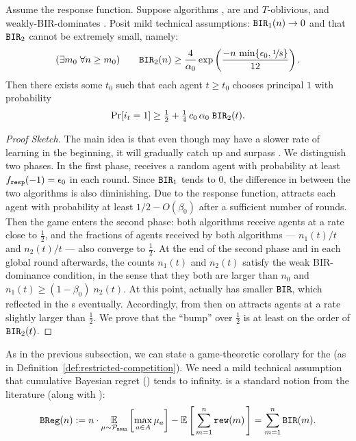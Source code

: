 \begin{theorem}\label{thm:SoftMax-strong}
Assume the \SoftMaxRandom response function. Suppose algorithms \alg[1], \alg[2] are \bmonotone and $T$-oblivious, and \alg[1] weakly-BIR-dominates \alg[2]. Posit mild technical assumptions:
  $\mathtt{BIR}_1(n) \to 0$ and that $\mathtt{BIR}_2$ cannot be extremely small, namely:
\begin{align}\label{eq:SoftMax-assn-strong}
(\exists m_0\; \forall n\geq m_0) \qquad
\mathtt{BIR}_2(n) \geq \frac{4}{\alpha_0}
\exp \left( \frac{-n\,\min\{\epsilon_0, \nicefrac{1}{8}\}}{12}\right).
\end{align}
Then there
  exists some $t_0$ such that each agent $t\geq t_0$ chooses principal
  $1$ with probability
\begin{align}\label{eq:thm:SoftMax-strong}
     \Pr[i_t = 1]\geq \tfrac12 +  \tfrac14 \,c_0\,\alpha_0\; \mathtt{BIR}_2(t).
\end{align}
\end{theorem}

\begin{proof}[Proof Sketch]
The main idea is that even though \alg[1] may have a
slower rate of learning in the beginning, it will gradually catch up
and surpass \alg[2]. We distinguish two phases. In
the first phase, \alg[1] receives a random agent with probability at
least $f_{\mathtt{resp}}(-1) = \epsilon_0$ in each round. Since $\mathtt{BIR}_1$ tends to 0,
the difference in  between the two algorithms is also
diminishing. Due to the \SoftMaxRandom response function, \alg[1]
attracts each agent with probability at least $1/2 - O(\beta_0)$ after
a sufficient number of rounds. Then the game enters the second phase:
both algorithms receive agents at a rate close to $\tfrac12$, and the
fractions of agents received by both algorithms --- $n_1(t)/t$ and
$n_2(t)/t$ --- also converge to $\tfrac12$. At the end of the second
phase and in each global round afterwards, the counts $n_1(t)$ and
$n_2(t)$ satisfy the weak BIR-dominance condition, in the sense that
they both are larger than $n_0$ and $n_1(t)\geq (1-\beta_0)\; n_2(t)$.
At this point, \alg[1] actually has smaller $\mathtt{BIR}$, which reflected in the {\PMR}s eventually. Accordingly, from then on \alg[1]
attracts agents at a rate slightly larger than $\tfrac12$. We prove
that the ``bump'' over $\tfrac12$ is at least on the order of
$\mathtt{BIR}_2(t)$.
\end{proof}

As in the previous subsection, we can state a game-theoretic corollary for the \FiniteGame (as in Definition~\ref{def:restricted-competition}). We need a mild technical assumption that cumulative Bayesian regret (\BReg) tends to infinity. \BReg is a standard notion from the literature (along with \BIR):
\begin{align}\label{eq:SoftMax-BReg}
\BReg(n) := n\cdot \E_{\mu\sim\priorMu}
    \left[ \max_{a\in A} \mu_a\right] -
    \E\sbr{ \sum_{m=1}^n \rew(m)}
    = \sum_{m=1}^n \BIR(m).
\end{align}


